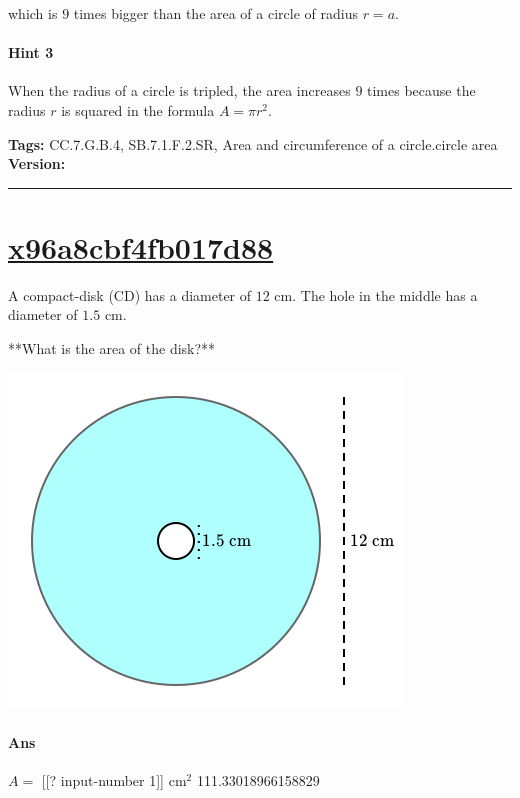 \documentclass[twocolumn,10pt]{article}
\def\shrinkfactor{0.45}
\begin{document}
which is $9$ times bigger than the area of a circle of radius $r=a$. 

\paragraph{Hint 3}When the radius of a circle is tripled, the area increases $9$ times because the radius $r$ is squared in the formula $A=\pi r^2$. 



\medskip
\noindent
\textbf{Tags:} {\footnotesize CC.7.G.B.4, SB.7.1.F.2.SR, Area and circumference of a circle.circle area}\\
\textbf{Version:} \DIFdelbegin {}\DIFdelend \DIFaddbegin {}\DIFaddend \smallskip\hrule





\section{\href{https://www.khanacademy.org/devadmin/content/items/x96a8cbf4fb017d88}{x96a8cbf4fb017d88}}

\noindent
A compact-disk (CD) has a diameter of $12\text{ cm}$. The hole in the middle has a diameter of $1.5\text{ cm}$. 

**What is the area of the disk?**  


\includegraphics[scale=\shrinkfactor]{figures/fea5db7586f0e819785c674bb2fc6212dda1ce88.png}

\paragraph{Ans} $A =$ [[? input-number 1]] $\text{cm}^2$  111.33018966158829
\end{document}
